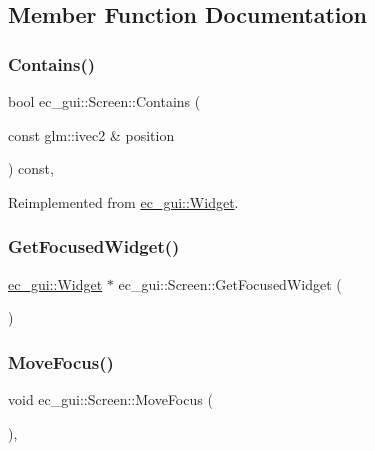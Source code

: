 \subsection{Member Function Documentation}
\mbox{\label{classec__gui_1_1_screen_a99d3e8673ceedf958fd36c470575be65}} 
\subsubsection{\texorpdfstring{Contains()}{Contains()}}
{\footnotesize\ttfamily bool ec\+\_\+gui\+::\+Screen\+::\+Contains (\begin{DoxyParamCaption}\item[{const glm\+::ivec2 \&}]{position }\end{DoxyParamCaption}) const\hspace{0.3cm}{\ttfamily [override]}, {\ttfamily [virtual]}}



Reimplemented from \mbox{\hyperlink{classec__gui_1_1_widget_a61c3184d7fddb724bcf4a956a3f0e662}{ec\+\_\+gui\+::\+Widget}}.

\mbox{\label{classec__gui_1_1_screen_af2a3ff2e547e2a1a7bb25ecec1f1a1bf}} 
\subsubsection{\texorpdfstring{Get\+Focused\+Widget()}{GetFocusedWidget()}}
{\footnotesize\ttfamily \mbox{\hyperlink{classec__gui_1_1_widget}{ec\+\_\+gui\+::\+Widget}} $\ast$ ec\+\_\+gui\+::\+Screen\+::\+Get\+Focused\+Widget (\begin{DoxyParamCaption}{ }\end{DoxyParamCaption})}

\mbox{\label{classec__gui_1_1_screen_ad80e3b3a1ea500da673e62675185ff18}} 
\subsubsection{\texorpdfstring{Move\+Focus()}{MoveFocus()}}
{\footnotesize\ttfamily void ec\+\_\+gui\+::\+Screen\+::\+Move\+Focus (\begin{DoxyParamCaption}{ }\end{DoxyParamCaption})\hspace{0.3cm}{\ttfamily [override]}, {\ttfamily [virtual]}}



